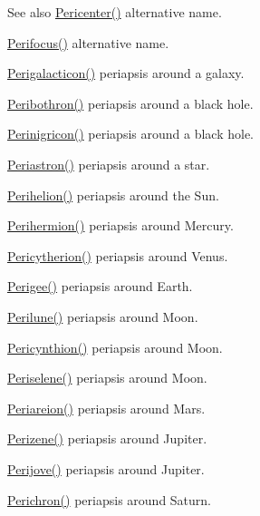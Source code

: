 \begin{DoxySeeAlso}{See also}
\mbox{\hyperlink{group___periapsis_gac4c419a87a5802cf6afc98f50792e99f}{Pericenter()}} alternative name. 

\mbox{\hyperlink{group___periapsis_gaff62669fb364a245cb85f9a91d8ea71f}{Perifocus()}} alternative name. 

\mbox{\hyperlink{group___periapsis_ga074fecab96b90bebffa512a37e52d90b}{Perigalacticon()}} periapsis around a galaxy. 

\mbox{\hyperlink{group___periapsis_gada5892309279a3a687c4eb2f88238e4e}{Peribothron()}} periapsis around a black hole. 

\mbox{\hyperlink{group___periapsis_ga99d86af90179994e17158b082c502fd4}{Perinigricon()}} periapsis around a black hole. 

\mbox{\hyperlink{group___periapsis_ga477de6824cbb5986cdae923141e21648}{Periastron()}} periapsis around a star. 

\mbox{\hyperlink{group___periapsis_ga941d285e3a0b48ada9c9f60925ff63c2}{Perihelion()}} periapsis around the Sun. 

\mbox{\hyperlink{group___periapsis_ga9562e9cbfd73019ae9cdaa643b843d63}{Perihermion()}} periapsis around Mercury. 

\mbox{\hyperlink{group___periapsis_gaa270e364cbbd7d3d6212872df484926f}{Pericytherion()}} periapsis around Venus. 

\mbox{\hyperlink{group___periapsis_gae2d053caf69cb0b4c3207064a2ab143a}{Perigee()}} periapsis around Earth. 

\mbox{\hyperlink{group___periapsis_ga2cc7ab05e18d32c94d8d74972e032793}{Perilune()}} periapsis around Moon. 

\mbox{\hyperlink{group___periapsis_gaeeba153b188cd06cbd233eaef12f0a6a}{Pericynthion()}} periapsis around Moon. 

\mbox{\hyperlink{group___periapsis_ga255874374dde571531e443cdbef9ef0c}{Periselene()}} periapsis around Moon. 

\mbox{\hyperlink{group___periapsis_ga0617ba07a30b0fd0544c02f691bfae26}{Periareion()}} periapsis around Mars. 

\mbox{\hyperlink{group___periapsis_ga0523c65b7fc26e675388b2c3d38aa00b}{Perizene()}} periapsis around Jupiter. 

\mbox{\hyperlink{group___periapsis_ga075052f7ff9aa1d5fdf4501b493be86b}{Perijove()}} periapsis around Jupiter. 

\mbox{\hyperlink{group___periapsis_ga12b5e99aa2e3e7031ef6ce93060cf516}{Perichron()}} periapsis around Saturn. 


\end{DoxySeeAlso}
